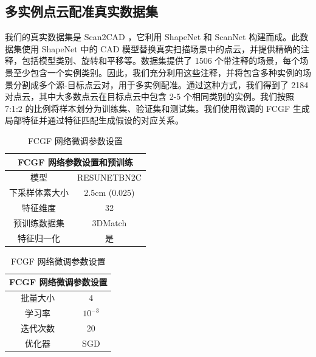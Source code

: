 \subsection{多实例点云配准真实数据集}
我们的真实数据集是 Scan2CAD ，它利用 ShapeNet 和 ScanNet 构建而成。此数据集使用 ShapeNet 中的 CAD 模型替换真实扫描场景中的点云，并提供精确的注释，包括模型类别、旋转和平移等。数据集提供了 1506 个带注释的场景，每个场景至少包含一个实例类别。因此，我们充分利用这些注释，并将包含多种实例的场景分割成多个源-目标点云对，用于多实例配准。通过这种方式，我们得到了 2184 对点云，其中大多数点云在目标点云中包含 2-5 个相同类别的实例。我们按照 7:1:2 的比例将样本划分为训练集、验证集和测试集。我们使用微调的 FCGF\cite{FCGF2019} 生成局部特征并通过特征匹配生成假设的对应关系。
\begin{table}[h]
    \centering
    \vspace{-1.0cm}
    \begin{minipage}{0.45\textwidth}
        \centering
        \caption{FCGF 网络参数设置和预训练}
        \label{tab:fcgf}
        \begin{tabular}{cc}
        \toprule
        \multicolumn{2}{c}{FCGF 网络参数设置和预训练} \\ 
        \midrule
        模型                 & RESUNETBN2C      \\ 
        下采样体素大小          & 2.5cm (0.025)    \\ 
        特征维度                & 32               \\ 
        预训练数据集             & 3DMatch          \\ 
        特征归一化              & 是               \\ 
        \bottomrule
        \end{tabular}
    \end{minipage}
    \hfill
    \begin{minipage}{0.45\textwidth}
        \centering
        \caption{FCGF 网络微调参数设置}
        \label{tab:fcgf_finetune}
        \begin{tabular}{cc}
        \toprule
        \multicolumn{2}{c}{FCGF 网络微调参数设置} \\ 
        \midrule
        批量大小               & 4                 \\ 
        学习率                 & $10^{-3}$         \\ 
        迭代次数                & 20                \\ 
        优化器                 & SGD               \\ 
        \bottomrule
        \end{tabular}
    \end{minipage}
    \vspace{-1.0cm}
\end{table}

